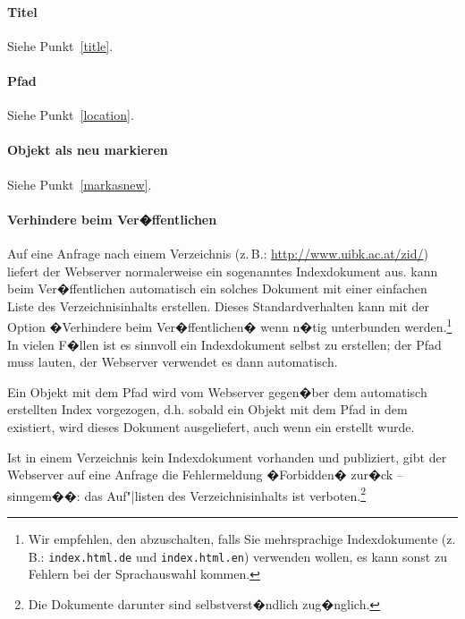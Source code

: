 \paragraph{Titel}
Siehe Punkt~\ref{title}.

\paragraph{Pfad}
Siehe Punkt~\ref{location}.

\paragraph{Objekt als neu markieren}
Siehe Punkt~\ref{markasnew}.

\paragraph{Verhindere  beim Ver�ffentlichen}
\label{autoindex}

Auf eine Anfrage nach einem Verzeichnis (z.\,B.: \url{http://www.uibk.ac.at/zid/}) liefert der
Webserver normalerweise ein sogenanntes Indexdokument aus.  kann beim
Ver�ffentlichen automatisch ein solches Dokument mit einer einfachen Liste des
Verzeichnisinhalts erstellen. Dieses Standardverhalten kann mit der Option
�Verhindere  beim Ver�ffentlichen� wenn n�tig unterbunden
werden.\footnote{Wir empfehlen, den  abzuschalten, falls Sie mehrsprachige Indexdokumente (z.\,B.:
  \nolinkurl{index.html.de} und \nolinkurl{index.html.en}) verwenden wollen, es kann sonst zu Fehlern bei der
  Sprachauswahl kommen.} In vielen F�llen ist es sinnvoll ein Indexdokument selbst zu erstellen; 
  der Pfad
  muss  lauten, der Webserver verwendet es dann automatisch.

\begin{Hinweis}
  Ein Objekt mit 
  dem Pfad  
  wird vom Webserver gegen�ber dem automatisch
  erstellten Index vorgezogen, d.h. sobald ein Objekt mit 
  dem Pfad 
   in dem 
  existiert, wird dieses Dokument ausgeliefert, auch wenn ein
   erstellt wurde.
\end{Hinweis}

Ist in einem Verzeichnis kein Indexdokument vorhanden und publiziert, gibt der
Webserver auf eine Anfrage die Fehlermeldung
�Forbidden� zur�ck -- sinngem��: das Auf"|listen des Verzeichnisinhalts ist
verboten.\footnote{Die Dokumente darunter sind selbstverst�ndlich zug�nglich.}

